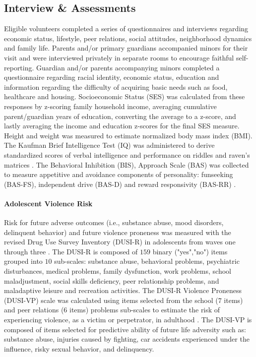 \documentclass[utf8]{article}
\begin{document}
\subsection*{Interview \& Assessments}
Eligible volunteers completed a series of questionnaires and interviews regarding economic status, lifestyle, peer relations, social attitudes, neighborhood dynamics and family life. Parents and/or primary guardians accompanied minors for their visit and were interviewed privately in separate rooms to encourage faithful self-reporting. Guardian and/or parents accompanying minors completed a questionnaire regarding racial identity, economic status, education and information regarding the difficulty of acquiring basic needs such as food, healthcare and housing. Socioeconomic Status (SES) was calculated from these responses by z-scoring family household income, averaging cumulative parent/guardian years of education, converting the average to a z-score, and lastly averaging the income and education z-scores for the final SES measure. Height and weight was measured to estimate normalized body mass index (BMI). The Kaufman Brief Intelligence Test (IQ) was administered to derive standardized scores of verbal intelligence and performance on riddles and raven’s matrices \citep{kaufman2004kaufman}. The Behavioral Inhibition (BIS), Approach Scale (BAS) was collected to measure appetitive and avoidance components of personality:  funseeking (BAS-FS), independent drive (BAS-D) and reward responsivity (BAS-RR) \citep{carver1994behavioral}.
\paragraph{Adolescent Violence Risk} 
Risk for future adverse outcomes (i.e., substance abuse, mood disorders, delinquent behavior) and future violence proneness was measured with the revised Drug Use Survey Inventory (DUSI-R) in adolescents from waves one through three  \citep*{tarter1994reliability}. The DUSI-R is composed of $159$ binary ("yes","no") items grouped into $10$ sub-scales: substance abuse, behavioral problems, psychiatric disturbances, medical problems, family dysfunction, work problems, school maladjustment, social skills deficiency, peer relationship problems, and maladaptive leisure and recreation activities. The DUSI-R Violence Proneness (DUSI-VP) scale was calculated using items selected from the school ($7$ items) and peer relations ($6$ items) problems sub-scales to estimate the risk of experiencing violence, as a victim or perpetrator, in adulthood \citep*{kirisci2009violence}. The DUSI-VP is composed of items selected for predictive ability of future life adversity such as: substance abuse, injuries caused by fighting, car accidents experienced under the influence, risky sexual behavior, and delinquency.
\end{document}
